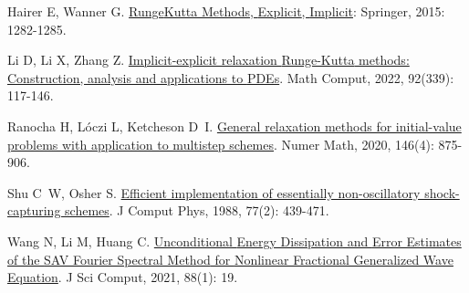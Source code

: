 \begin{thebibliography}{79}
    Hairer E, Wanner G.
    \newblock \href{https://doi.org/10.1007/978-3-540-70529-1_144}{Runge{\textendash}{{Kutta Methods}}, {{Explicit}}, {{Implicit}}}\allowbreak[M]
    : {Springer}, 2015: 1282-1285.
    
    Li D, Li X, Zhang Z.
    \newblock \href{https://www.ams.org/mcom/2023-92-339/S0025-5718-2022-03766-2/}{Implicit-explicit relaxation {{Runge-Kutta}} methods: Construction, analysis and applications to {{PDEs}}}\allowbreak[J].
    \newblock Math Comput, 2022, 92\allowbreak (339): 117-146.
    
    Ranocha H, L{\'o}czi L, Ketcheson D~I.
    \newblock \href{https://doi.org/10.1007/s00211-020-01158-4}{General relaxation methods for initial-value problems with application to multistep schemes}\allowbreak[J].
    \newblock Numer Math, 2020, 146\allowbreak (4): 875-906.
    
    Shu C~W, Osher S.
    \newblock \href{https://www.sciencedirect.com/science/article/pii/0021999188901775}{Efficient implementation of essentially non-oscillatory shock-capturing schemes}\allowbreak[J].
    \newblock J Comput Phys, 1988, 77\allowbreak (2): 439-471.
    
    Wang N, Li M, Huang C.
    \newblock \href{https://link.springer.com/10.1007/s10915-021-01534-8}{Unconditional {{Energy Dissipation}} and {{Error Estimates}} of the {{SAV Fourier Spectral Method}} for {{Nonlinear Fractional Generalized Wave Equation}}}\allowbreak[J].
    \newblock J Sci Comput, 2021, 88\allowbreak (1): 19.
    
    \end{thebibliography}
    